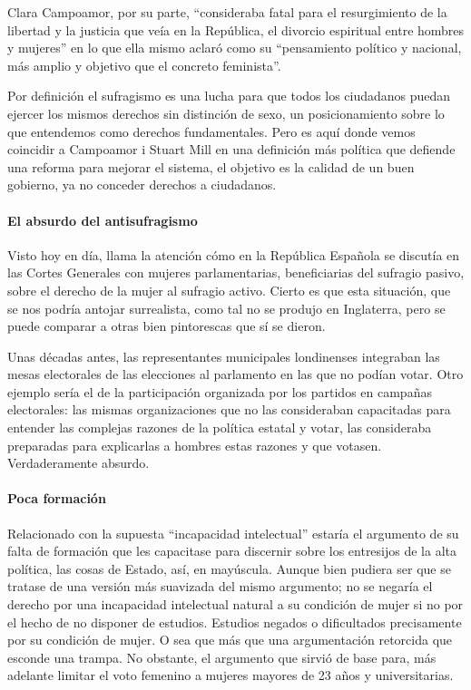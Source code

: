 \documentclass[
]{article}
\begin{document}
Clara Campoamor, por su parte, ``consideraba fatal para el resurgimiento
de la libertad y la justicia que veía en la República, el divorcio
espiritual entre hombres y mujeres'' en lo que ella mismo aclaró como su
``pensamiento político y nacional, más amplio y objetivo que el concreto
feminista''.

Por definición el sufragismo es una lucha para que todos los ciudadanos
puedan ejercer los mismos derechos sin distinción de sexo, un
posicionamiento sobre lo que entendemos como derechos fundamentales.
Pero es aquí donde vemos coincidir a Campoamor i Stuart Mill en una
definición más política que defiende una reforma para mejorar el
sistema, el objetivo es la calidad de un buen gobierno, ya no conceder
derechos a ciudadanos.

\hypertarget{el-absurdo-del-antisufragismo}{%
\paragraph{El absurdo del
antisufragismo}\label{el-absurdo-del-antisufragismo}}

Visto hoy en día, llama la atención cómo en la República Española se
discutía en las Cortes Generales con mujeres parlamentarias,
beneficiarias del sufragio pasivo, sobre el derecho de la mujer al
sufragio activo. Cierto es que esta situación, que se nos podría antojar
surrealista, como tal no se produjo en Inglaterra, pero se puede
comparar a otras bien pintorescas que sí se dieron.

Unas décadas antes, las representantes municipales londinenses
integraban las mesas electorales de las elecciones al parlamento en las
que no podían votar. Otro ejemplo sería el de la participación
organizada por los partidos en campañas electorales: las mismas
organizaciones que no las consideraban capacitadas para entender las
complejas razones de la política estatal y votar, las consideraba
preparadas para explicarlas a hombres estas razones y que votasen.
Verdaderamente absurdo.

\hypertarget{poca-formaciuxf3n}{%
\paragraph{Poca formación}\label{poca-formaciuxf3n}}

Relacionado con la supuesta ``incapacidad intelectual'' estaría el
argumento de su falta de formación que les capacitase para discernir
sobre los entresijos de la alta política, las cosas de Estado, así, en
mayúscula. Aunque bien pudiera ser que se tratase de una versión más
suavizada del mismo argumento; no se negaría el derecho por una
incapacidad intelectual natural a su condición de mujer si no por el
hecho de no disponer de estudios. Estudios negados o dificultados
precisamente por su condición de mujer. O sea que más que una
argumentación retorcida que esconde una trampa. No obstante, el
argumento que sirvió de base para, más adelante limitar el voto femenino
a mujeres mayores de 23 años y universitarias.
\end{document}

